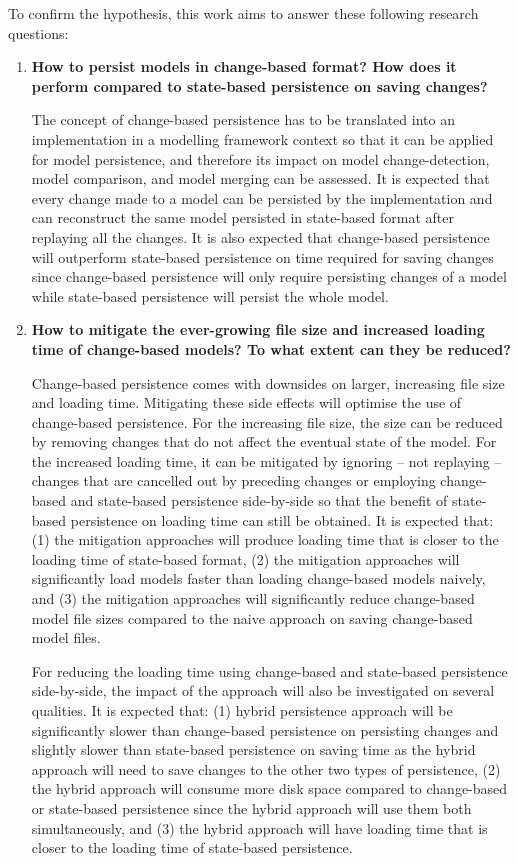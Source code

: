 \documentclass[12pt, a4paper]{report} \usepackage[titletoc]{appendix}
\begin{document}
To confirm the hypothesis, this work aims to answer these following research questions: 
\begin{enumerate} 
	\item \textbf{How to persist models in change-based format? How does it perform compared to state-based persistence on saving changes?} 
	
	The concept of change-based persistence has to be translated into an implementation in a modelling framework context so that it can be applied for model persistence, and therefore its impact on model change-detection, model comparison, and model merging can be assessed. It is expected that every change made to a model can be persisted by the implementation and can reconstruct the same model persisted in state-based format after replaying all the changes. It is also expected that change-based persistence will outperform state-based persistence on time required for saving changes since change-based persistence will only require persisting changes of a model while state-based persistence will persist the whole model. 
	
	\item \textbf{How to mitigate the ever-growing file size and increased loading time of change-based models? To what extent can they be reduced?} 
	
    Change-based persistence comes with downsides on larger, increasing file size and loading time. Mitigating these side effects will optimise the use of change-based persistence. For the increasing file size, the size can be reduced by removing changes that do not affect the eventual state of the model. For the increased loading time, it can be mitigated by ignoring -- not replaying -- changes that are cancelled out by preceding changes or employing change-based and state-based persistence side-by-side so that the benefit of state-based persistence on loading time can still be obtained. It is expected that: (1) the mitigation approaches will produce loading time that is closer to the loading time of state-based format, (2) the mitigation approaches will significantly load models faster than loading change-based models naively, and (3) the mitigation approaches will significantly reduce change-based model file sizes compared to the naive approach on saving change-based model files. 

	For reducing the loading time using change-based and state-based persistence side-by-side, the impact of the approach will also be investigated on several qualities. It is expected that: (1) hybrid persistence approach will be significantly slower than change-based persistence on persisting changes and slightly slower than state-based persistence on saving time as the hybrid approach will need to save changes to the other two types of persistence, (2) the hybrid approach will consume more disk space compared to change-based or state-based persistence since the hybrid approach will use them both simultaneously, and (3) the hybrid approach will have loading time that is closer to the loading time of state-based persistence. 
    

\end{enumerate}
\end{document}
